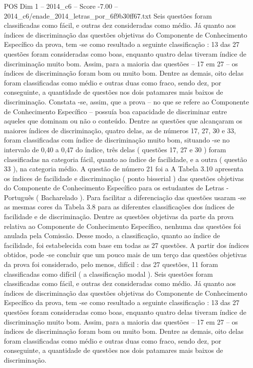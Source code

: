 \begin{textsample}{POS Dim 1 – 2014\_c6 – Score -7.00 – 2014\_c6/enade\_2014\_letras\_por\_6f9b30ff67.txt}
Seis questões foram classificadas como fácil, e outras dez consideradas como médio.
Já quanto aos índices de discriminação das questões objetivas do Componente de Conhecimento Específico da prova, tem -se como resultado a seguinte classificação : 13 das 27 questões foram consideradas como boas, enquanto quatro delas tiveram índice de discriminação muito bom.
Assim, para a maioria das questões – 17 em 27 – os índices de discriminação foram bom ou muito bom.
Dentre as demais, oito delas foram classificadas como médio e outras duas como fraco, sendo dez, por conseguinte, a quantidade de questões nos dois patamares mais baixos de discriminação.
Constata -se, assim, que a prova – no que se refere ao Componente de Conhecimento Específico – possuía boa capacidade de discriminar entre aqueles que dominam ou não o conteúdo.
Dentre as questões que alcançaram os maiores índices de discriminação, quatro delas, as de números 17, 27, 30 e 33, foram classificadas com índice de discriminação muito bom, situando -se no intervalo de 0,40 a 0,47 do índice, três delas ( questões 17, 27 e 30 ) foram classificadas na categoria fácil, quanto ao índice de facilidade, e a outra ( questão 33 ), na categoria médio.
A questão de número 21 foi a A Tabela 3.10 apresenta os índices de facilidade e discriminação ( ponto bisserial ) das questões objetivas do Componente de Conhecimento Específico para os estudantes de Letras - Português ( Bacharelado ).
Para facilitar a diferenciação das questões usaram -se as mesmas cores da Tabela 3.8 para as diferentes classificações dos índices de facilidade e de discriminação.
Dentre as questões objetivas da parte da prova relativa ao Componente de Conhecimento Específico, nenhuma das questões foi anulada pela Comissão.
Desse modo, a classificação, quanto ao índice de facilidade, foi estabelecida com base em todas as 27 questões.
A partir dos índices obtidos, pode -se concluir que um pouco mais de um terço das questões objetivas da prova foi considerado, pelo menos, difícil : das 27 questões, 11 foram classificadas como difícil ( a classificação modal ).
Seis questões foram classificadas como fácil, e outras dez consideradas como médio.
Já quanto aos índices de discriminação das questões objetivas do Componente de Conhecimento Específico da prova, tem -se como resultado a seguinte classificação : 13 das 27 questões foram consideradas como boas, enquanto quatro delas tiveram índice de discriminação muito bom.
Assim, para a maioria das questões – 17 em 27 – os índices de discriminação foram bom ou muito bom.
Dentre as demais, oito delas foram classificadas como médio e outras duas como fraco, sendo dez, por conseguinte, a quantidade de questões nos dois patamares mais baixos de discriminação.

\end{textsample}
